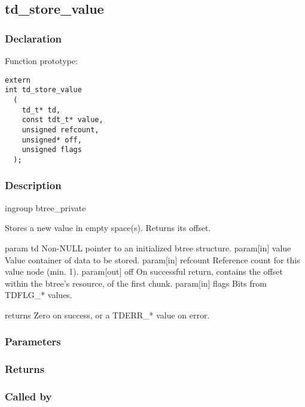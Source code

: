 
\newpage
\subsection{td\_store\_value}
\subsubsection{Declaration} Function prototype:

\begin{verbatim}
extern
int td_store_value
  (
    td_t* td,
    const tdt_t* value,
    unsigned refcount,
    unsigned* off,
    unsigned flags
  );
\end{verbatim}

\subsubsection{Description}


 ingroup btree\_private

 Stores a new value in empty space(s). Returns its offset.

 param td Non-NULL pointer to an initialized btree structure.
 param[in] value Value container of data to be stored.
 param[in] refcount Reference count for this value node (min. 1).
 param[out] off On successful return, contains the offset within
 the btree's resource, of the first chunk.
 param[in] flags Bits from TDFLG\_* values.

 returns Zero on success, or a TDERR\_* value on error.
 

\subsubsection{Parameters}
\subsubsection{Returns}
\subsubsection{Called by}
